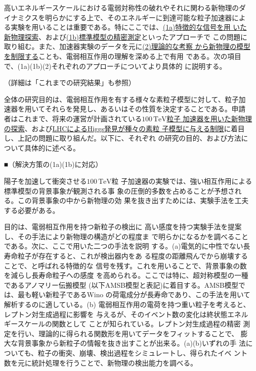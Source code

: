 \documentclass[11pt,a4paper,twoside,dvipdfmx]{jarticle}		%
\newcommand{\研究課題名}{粒子加速器を用いた電弱相互作用を持つ新物理の探索}
\newcommand{\研究機関名}{東京大学}
\newcommand{\申請者氏名}{千草颯}
\newcommand{\研究代表者氏名}{\申請者氏名}
\newcommand{\研究期間の最終元号年度}{34}	%
\begin{document}
{%
高いエネルギースケールにおける電弱対称性の破れやそれに関わる新物理のダ
イナミクスを明らかにする上で、そのエネルギーに到達可能な粒子加速器によ
る実験を用いることは重要である。特にここでは、\ul{(1a)特徴的な信号を用
いた新物理探索}、および\ul{(1b)標準模型の精密測定}といったアプローチで
この問題に取り組む。また、加速器実験のデータを元に\ul{(2)理論的な考察
から新物理の模型を制限する}ことも、電弱相互作用の理解を深める上で有用
である。次の項目で、(1a)(1b)(2)それぞれのアプローチについてより具体的
に説明する。

\vspace*{1mm}

（詳細は「これまでの研究結果」も参照）

\vspace*{1mm}

全体の研究目的は、電弱相互作用を有する様々な素粒子模型に対して、粒子加
速器を用いてそれらを発見し、あるいはその性質を決定することである。申請
者はこれまで、将来の運営が計画されている\ul{{$100\,\mathrm{TeV}$}粒子
加速器を用いた新物理の探索}、および\ul{LHCによるHiggs発見が種々の素粒
子模型に与える制限}に着目し、上記の問題に取り組んだ。以下に、それぞれ
の研究の目的、および方法について具体的に述べる。

\vspace*{1mm}

■（解決方策の(1a)(1b)に対応）

\vspace*{1mm}

陽子を加速して衝突させる$100\,\mathrm{TeV}$粒
子加速器の実験では、強い相互作用による標準模型の背景事象が観測される事
象の圧倒的多数を占めることが予想される。この背景事象の中から新物理の効
果を抜き出すためには、実験手法を工夫する必要がある。

目的は、電弱相互作用を持つ新粒子の検出に
高い感度を持つ実験手法を提案し、その手法により新物理の構造がどの程度ま
で明らかになるかを調べることである。次に、ここで用いた二つの手法を説明
する。(a)電気的に中性でない長寿命粒子が存在すると、これが検出器内をあ
る程度の距離飛んでから崩壊することで、と呼ばれる特徴的な
信号を残す。これを用いることで、背景事象の数を減らし長寿命粒子への感度
を高められる。ここでは特に、超対称模型の一種であるアノマリー伝搬模型
(以下AMSB模型と表記)に着目する。AMSB模型では、最も軽い新粒子であるWino
の荷電成分が長寿命であり、この手法を用いて解析するのに適している。(b)
電弱相互作用の電荷を持つ重い粒子を考えると、レプトン対生成過程に影響を
与えるが、そのイベント数の変化は終状態エネルギースケールの関数として
ことが知られている。レプトン対生成過程の精密
測定を行い、理論的に得られる関数形を用いてデータをフィットすることで、
膨大な背景事象から新粒子の情報を抜き出すことが出来る。(a)(b)いずれの手
法についても、粒子の衝突、崩壊、検出過程をシミュレートし、得られたイベ
ント数を元に統計処理を行うことで、新物理の検出能力を調べる。

}
\end{document}
